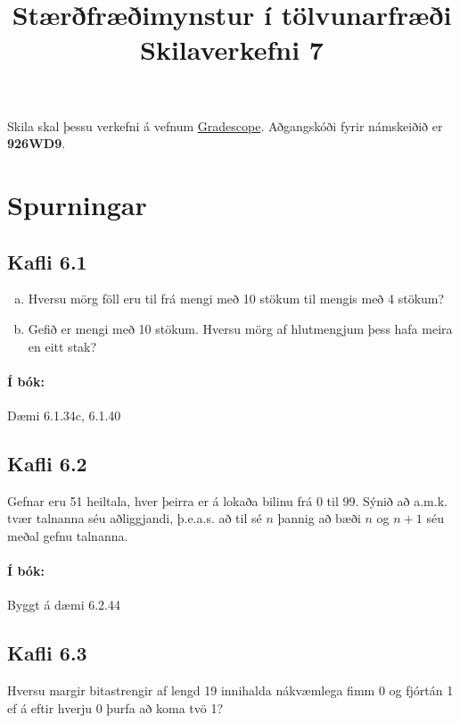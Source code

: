 \documentclass{exam}
\title{Stærðfræðimynstur í tölvunarfræði \\ Skilaverkefni 7}
\author{}
\begin{document}
\maketitle
\thispagestyle{empty} 

Skila skal þessu verkefni á vefnum \href{https://gradescope.com/}{Gradescope}. Aðgangskóði fyrir námskeiðið er \textbf{926WD9}.


\section{Spurningar}

\begin{questions}

\subsection{Kafli 6.1}

\question 
\begin{enumerate}[a)]
 \item Hversu mörg föll eru til frá mengi með 10 stökum til mengis með 4 stökum?
 \item Gefið er mengi með 10 stökum. Hversu mörg af hlutmengjum þess hafa meira en eitt stak?
\end{enumerate}

\paragraph{Í bók:} Dæmi 6.1.34c, 6.1.40

\subsection{Kafli 6.2}

\question Gefnar eru 51 heiltala, hver þeirra er á lokaða bilinu frá 0 til 99. Sýnið að a.m.k. tvær talnanna séu aðliggjandi, þ.e.a.s. að til sé $n$ þannig að bæði $n$ og $n+1$ séu meðal gefnu talnanna.

\paragraph{Í bók:} Byggt á dæmi 6.2.44

\subsection{Kafli 6.3}

\question Hversu margir bitastrengir af lengd 19 innihalda nákvæmlega fimm 0 og fjórtán 1 ef á eftir hverju 0 þurfa að koma tvö 1?


\end{questions}
\end{document}
